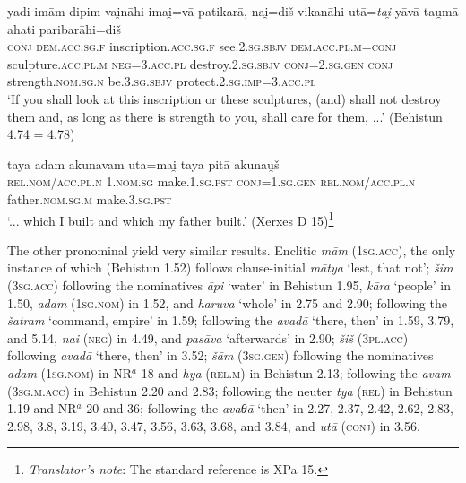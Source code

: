 \begin{exe}
\ex
\gll yadi imām dipim vai̯nāhi imai̯=vā patikarā, nai̯=diš vikanāhi utā=\emph{tai̯} yāvā tau̯mā ahati paribarāhi=diš\\
\textsc{conj} \textsc{dem.acc.sg.f} inscription.\textsc{acc.sg.f} see.\textsc{2.sg.sbjv} \textsc{dem.acc.pl.m}=\textsc{conj} sculpture.\textsc{acc.pl.m} \textsc{neg}=\textsc{3.acc.pl} destroy.\textsc{2.sg.sbjv} \textsc{conj}=\textsc{2.sg.gen} \textsc{conj} strength.\textsc{nom.sg.n} be.\textsc{3.sg.sbjv} protect.\textsc{2.sg.imp}=\textsc{3.acc.pl}\\
\trans `If you shall look at this inscription or these sculptures, (and) shall not destroy them and, as long as there is strength to you, shall care for them, ...' (Behistun 4.74 = 4.78)
\label{behistun474}
\end{exe}

\begin{exe}
\ex
\gll taya adam akunavam uta=mai̯ taya pitā akunau̯š\\
\textsc{rel.nom/acc.pl.n} \textsc{1.nom.sg} make.\textsc{1.sg.pst} \textsc{conj}=\textsc{1.sg.gen} \textsc{rel.nom/acc.pl.n} father.\textsc{nom.sg.m} make.\textsc{3.sg.pst}\\
\trans `... which I built and which my father built.' (Xerxes D 15)\footnote{\emph{Translator's note}: The standard reference is XPa 15.}
\label{xerxesd15}
\end{exe}

The other pronominal  yield very similar results. Enclitic \emph{mām} (\textsc{1sg.acc}), the only instance of which (Behistun 1.52) follows clause-initial \emph{mātya} `lest, that not'; \emph{šim} (\textsc{3sg.acc}) following the nominatives \emph{āpi} `water' in Behistun 1.95, \emph{kāra} `people' in 1.50, \emph{adam} (\textsc{1sg.nom}) in 1.52, and \emph{haruva} `whole' in 2.75 and 2.90; following the  \emph{šatram} `command, empire' in 1.59; following the  \emph{avadā} `there, then' in 1.59, 3.79, and 5.14, \emph{nai} (\textsc{neg}) in 4.49, and \emph{pasāva} `afterwards' in 2.90; \emph{šiš} (\textsc{3pl.acc}) following \emph{avadā} `there, then' in 3.52; \emph{šām} (\textsc{3sg.gen}) following the nominatives \emph{adam} (\textsc{1sg.nom}) in NR$^a$ 18 and \emph{hya} (\textsc{rel.m}) in Behistun 2.13; following the  \emph{avam} (\textsc{3sg.m.acc}) in Behistun 2.20 and 2.83; following the neuter \emph{tya} (\textsc{rel}) in Behistun 1.19 and NR$^a$ 20 and 36; following the  \emph{avaθā} `then' in 2.27, 2.37, 2.42, 2.62, 2.83, 2.98, 3.8, 3.19, 3.40, 3.47, 3.56, 3.63, 3.68, and 3.84, and \emph{utā} (\textsc{conj}) in 3.56.

